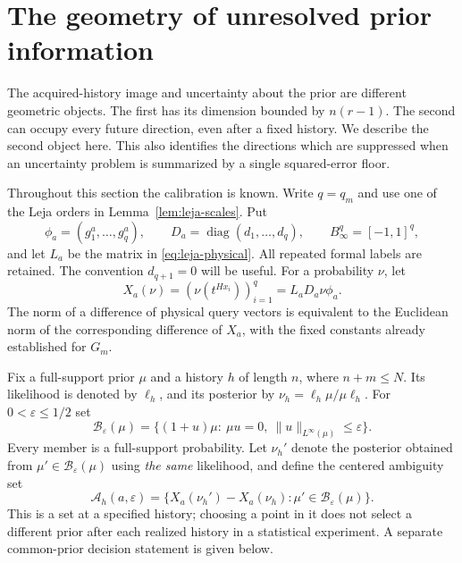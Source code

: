 \section{The geometry of unresolved prior information}
\label{sec:directional-geometry}
The acquired-history image and uncertainty about the prior are different
geometric objects. The first has its dimension bounded by $n(r-1)$.
The second can occupy every future direction, even after a fixed history.
We describe the second object here. This also identifies the directions
which are suppressed when an uncertainty problem is summarized by a
single squared-error floor.



Throughout this section the calibration is known. Write $q=q_m$ and use
one of the Leja orders in Lemma~\ref{lem:leja-scales}. Put
\[
 \phi_a=(g_1^a,\ldots,g_q^a),\qquad
 D_a=\operatorname{diag}(d_1,\ldots,d_q),\qquad
 B_\infty^q=[-1,1]^q,
\]
and let $L_a$ be the matrix in \eqref{eq:leja-physical}. All repeated
formal labels are retained. The convention $d_{q+1}=0$ will be useful.
For a probability $\nu$, let
\[
 X_a(\nu)=(\nu(t^{Hx_i}))_{i=1}^q=L_aD_a\nu\phi_a.
\]
The norm of a difference of physical query vectors is equivalent to the
Euclidean norm of the corresponding difference of $X_a$, with the fixed
constants already established for $G_m$.

Fix a full-support prior $\mu$ and a history $h$ of length $n$, where
$n+m\le N$. Its likelihood is denoted by $\ell_h$, and its posterior
by $\nu_h=\ell_h\mu/\mu\ell_h$. For $0<\varepsilon\le1/2$ set
\begin{equation}\label{eq:relative-prior-ball}
 \mathcal B_\varepsilon(\mu)=
 \{(1+u)\mu:\ \mu u=0,\ \|u\|_{L^\infty(\mu)}\le\varepsilon\}.
\end{equation}
Every member is a full-support probability. Let $\nu_h'$ denote the
posterior obtained from $\mu'\in\mathcal B_\varepsilon(\mu)$ using
\emph{the same} likelihood, and define the centered ambiguity set
\begin{equation}\label{eq:ambiguity-body}
 \mathcal A_h(a,\varepsilon)=
 \{X_a(\nu_h')-X_a(\nu_h):\mu'\in\mathcal B_\varepsilon(\mu)\}.
\end{equation}
This is a set at a specified history; choosing a point in it does not
select a different prior after each realized history in a statistical
experiment. A separate common-prior decision statement is given below.

